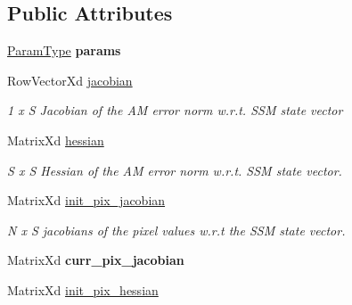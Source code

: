\subsection*{Public Attributes}
\begin{DoxyCompactItemize}
\item 
\hypertarget{classICLK_a2945308452b028417df86764bcf8a831}{\hyperlink{structICLKParams}{Param\-Type} {\bfseries params}}\label{classICLK_a2945308452b028417df86764bcf8a831}

\item 
\hypertarget{classICLK_afbabfa8946549910cc4e643788dc81e7}{Row\-Vector\-Xd \hyperlink{classICLK_afbabfa8946549910cc4e643788dc81e7}{jacobian}}\label{classICLK_afbabfa8946549910cc4e643788dc81e7}

\begin{DoxyCompactList}\small\item\em 1 x S Jacobian of the A\-M error norm w.\-r.\-t. S\-S\-M state vector \end{DoxyCompactList}\item 
\hypertarget{classICLK_ad13c158447f2aeec0dc13198294fd071}{Matrix\-Xd \hyperlink{classICLK_ad13c158447f2aeec0dc13198294fd071}{hessian}}\label{classICLK_ad13c158447f2aeec0dc13198294fd071}

\begin{DoxyCompactList}\small\item\em S x S Hessian of the A\-M error norm w.\-r.\-t. S\-S\-M state vector. \end{DoxyCompactList}\item 
\hypertarget{classICLK_ae35df2f2b1aacb31f06cbd236924fa10}{Matrix\-Xd \hyperlink{classICLK_ae35df2f2b1aacb31f06cbd236924fa10}{init\-\_\-pix\-\_\-jacobian}}\label{classICLK_ae35df2f2b1aacb31f06cbd236924fa10}

\begin{DoxyCompactList}\small\item\em N x S jacobians of the pixel values w.\-r.\-t the S\-S\-M state vector. \end{DoxyCompactList}\item 
\hypertarget{classICLK_aa534a53a187fcb3e7aa47327502c93bf}{Matrix\-Xd {\bfseries curr\-\_\-pix\-\_\-jacobian}}\label{classICLK_aa534a53a187fcb3e7aa47327502c93bf}

\item 
\hypertarget{classICLK_a1cef372827b58727ad0f1977974a9877}{Matrix\-Xd \hyperlink{classICLK_a1cef372827b58727ad0f1977974a9877}{init\-\_\-pix\-\_\-hessian}}\label{classICLK_a1cef372827b58727ad0f1977974a9877}


\end{DoxyCompactItemize}

